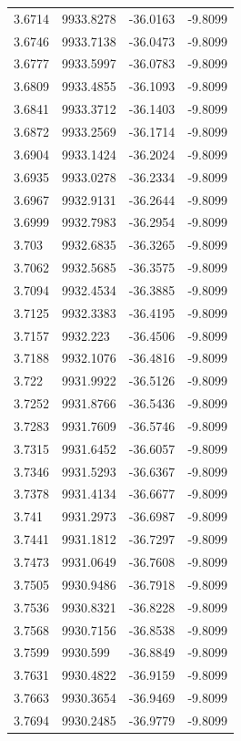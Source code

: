 \begin{table}[H]
\begin{tabular}{llll}
3.6714 & 9933.8278 & -36.0163 & -9.8099 \\
3.6746 & 9933.7138 & -36.0473 & -9.8099 \\
3.6777 & 9933.5997 & -36.0783 & -9.8099 \\
3.6809 & 9933.4855 & -36.1093 & -9.8099 \\
3.6841 & 9933.3712 & -36.1403 & -9.8099 \\
3.6872 & 9933.2569 & -36.1714 & -9.8099 \\
3.6904 & 9933.1424 & -36.2024 & -9.8099 \\
3.6935 & 9933.0278 & -36.2334 & -9.8099 \\
3.6967 & 9932.9131 & -36.2644 & -9.8099 \\
3.6999 & 9932.7983 & -36.2954 & -9.8099 \\
3.703 & 9932.6835 & -36.3265 & -9.8099 \\
3.7062 & 9932.5685 & -36.3575 & -9.8099 \\
3.7094 & 9932.4534 & -36.3885 & -9.8099 \\
3.7125 & 9932.3383 & -36.4195 & -9.8099 \\
3.7157 & 9932.223 & -36.4506 & -9.8099 \\
3.7188 & 9932.1076 & -36.4816 & -9.8099 \\
3.722 & 9931.9922 & -36.5126 & -9.8099 \\
3.7252 & 9931.8766 & -36.5436 & -9.8099 \\
3.7283 & 9931.7609 & -36.5746 & -9.8099 \\
3.7315 & 9931.6452 & -36.6057 & -9.8099 \\
3.7346 & 9931.5293 & -36.6367 & -9.8099 \\
3.7378 & 9931.4134 & -36.6677 & -9.8099 \\
3.741 & 9931.2973 & -36.6987 & -9.8099 \\
3.7441 & 9931.1812 & -36.7297 & -9.8099 \\
3.7473 & 9931.0649 & -36.7608 & -9.8099 \\
3.7505 & 9930.9486 & -36.7918 & -9.8099 \\
3.7536 & 9930.8321 & -36.8228 & -9.8099 \\
3.7568 & 9930.7156 & -36.8538 & -9.8099 \\
3.7599 & 9930.599 & -36.8849 & -9.8099 \\
3.7631 & 9930.4822 & -36.9159 & -9.8099 \\
3.7663 & 9930.3654 & -36.9469 & -9.8099 \\
3.7694 & 9930.2485 & -36.9779 & -9.8099 \\

\end{tabular}
\end{table}
